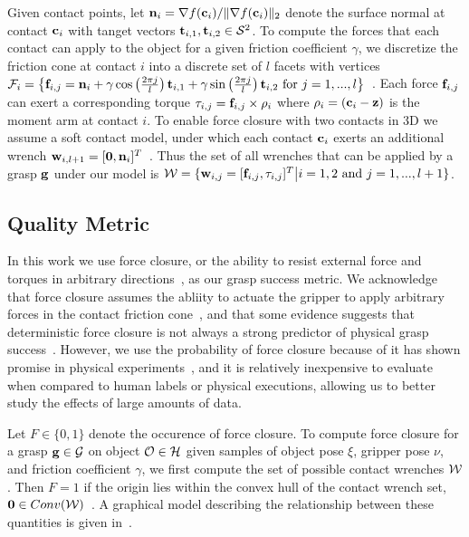 Given contact points, let $\mathbf{n}_i = \nabla f(\mathbf{c}_i) / \| \nabla f(\mathbf{c}_i) \|_2$ denote the surface normal at contact $\mathbf{c}_i$ with tanget vectors $\mathbf{t}_{i,1}, \mathbf{t}_{i,2} \in \mathcal{S}^2$.
To compute the forces that each contact can apply to the object for a given friction coefficient $\gamma$, we discretize the friction cone at contact $i$ into a discrete set of $l$ facets with vertices $\mathcal{F}_{i} = \left\{ \mathbf{f}_{i,j} = \mathbf{n}_i + \gamma \cos \left( \frac{2 \pi j}{l} \right) \mathbf{t}_{i,1} + \gamma \sin \left( \frac{2 \pi j}{l} \right) \mathbf{t}_{i,2} \text{ for } j = 1, ..., l \right\}$~\cite{pokorny2013classical}.
Each force $\mathbf{f}_{i,j}$ can exert a corresponding torque $\tau_{i,j} = \mathbf{f}_{i,j} \times \rho_i$ where $\rho_i = (\mathbf{c}_i - \mathbf{z})$ is the moment arm at contact $i$.
To enable force closure with two contacts in 3D we assume a soft contact model, under which each contact $\mathbf{c}_i$ exerts an additional wrench $\mathbf{w}_{i,l+1} = [\mathbf{0}, \mathbf{n}_i]^T$~\cite{prattichizzo2008grasping}.
Thus the set of all wrenches that can be applied by a grasp $\mathbf{g}$ under our model is $\mathcal{W} = \{ \mathbf{w}_{i,j} = [\mathbf{f}_{i,j}, \tau_{i,j}]^T \big| i = 1, 2 \text{ and } j = 1, ..., l+1\}$.

\subsection{Quality Metric}
In this work we use force closure, or the ability to resist external force and torques in arbitrary directions~\cite{ferrari1992}, as our grasp success metric.
We acknowledge that force closure assumes the abliity to actuate the gripper to apply arbitrary forces in the contact friction cone~\cite{}, and that some evidence suggests that deterministic force closure is not always a strong predictor of physical grasp success~\cite{balasubramanian2012physical}.
However, we use the probability of force closure because of it has shown promise in physical experiments~\cite{kim2012physically, weisz2012pose}, and it is relatively inexpensive to evaluate when compared to human labels or physical executions, allowing us to better study the effects of large amounts of data.

Let $F \in \{0, 1\}$ denote the occurence of force closure.
To compute force closure for a grasp $\mathbf{g} \in \mathcal{G}$ on object $\mathcal{O} \in \mathcal{H}$ given samples of object pose $\xi$, gripper pose $\nu$, and friction coefficient $\gamma$, we first compute the set of possible contact wrenches $\mathcal{W}$.
Then $F = 1$ if the origin lies within the convex hull of the contact wrench set, $\mathbf{0} \in Conv(\mathcal{W})$~\cite{weisz2012pose}.
A graphical model describing the relationship between these quantities is given in~.

